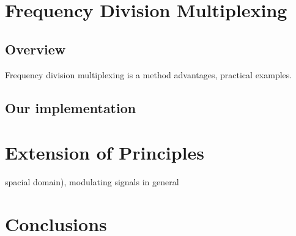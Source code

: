 \documentclass[12pt]{article}
\begin{document}
\section{Frequency Division Multiplexing}

\subsection{Overview}

Frequency division multiplexing is a method 
advantages, practical examples.

\subsection{Our implementation}


\section{Extension of Principles}

spacial domain), modulating signals in general

\section{Conclusions}
\end{document}
